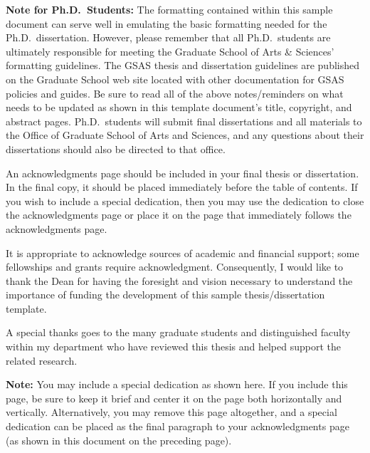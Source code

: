 \begin{thesisabstract}
\textbf{Note for Ph.D.\ Students:}
The formatting contained within this sample document can serve well in
emulating the basic formatting needed for the Ph.D.\ dissertation.   However,
please remember that all Ph.D.\ students are ultimately responsible for meeting
the Graduate School of Arts \& Sciences' formatting guidelines.  The GSAS
thesis and dissertation guidelines are published on the Graduate School web
site located with other documentation for GSAS policies and guides.  Be sure to
read all of the above notes/reminders on what needs to be updated as shown in
this template document's title, copyright, and abstract pages.  Ph.D.\ students
will submit final dissertations and all materials to the Office of Graduate
School of Arts and Sciences, and any questions about their dissertations should
also be directed to that office.
\end{thesisabstract}

\renewcommand{\thesisacknowledgmentpostscript}{
\textbf{Reminders of what needs to be updated:}
After removing these comments, use the above format to help input your
acknowledgments page.   A special dedication can be placed as the final
paragraph, as shown above; alternatively, you may include a special dedication
on the page that follows, as also shown in this sample template.}

\begin{thesisacknowledgments}
An acknowledgments page should be included in your final thesis or
dissertation.  In the final copy, it should be placed immediately before the
table of contents.  If you wish to include a special dedication, then you may
use the dedication to close the acknowledgments page or place it on the page
that immediately follows the acknowledgments page.  

It is appropriate to acknowledge sources of academic and financial support;
some fellowships and grants require acknowledgment.  Consequently, I would like
to thank the Dean for having the foresight and vision necessary to understand
the importance of funding the development of this sample thesis/dissertation
template.

A special thanks goes to the many graduate students and distinguished faculty
within my department who have reviewed this thesis and helped support the
related research.
\end{thesisacknowledgments}

\begin{thesisdedicationpage}                %
\textbf{Note:} You may include a special dedication as shown here.  If you
include this page, be sure to keep it brief and center it on the page both
horizontally and vertically.  Alternatively, you may remove this page
altogether, and a special dedication can be placed as the final paragraph to
your acknowledgments page (as shown in this document on the preceding page).
\end{thesisdedicationpage}

